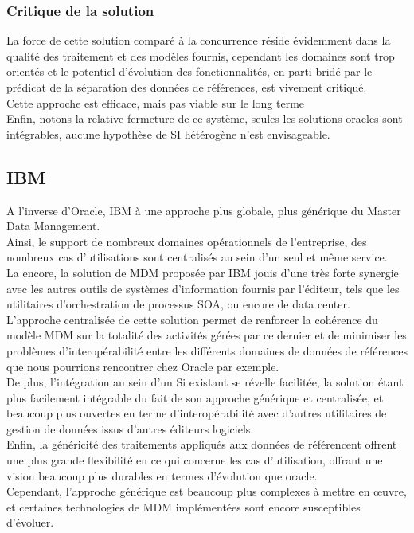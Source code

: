 \subsubsection{Critique de la solution}

La force de cette solution comparé à la concurrence réside évidemment dans la qualité des traitement et des modèles fournis, cependant les domaines sont trop orientés et le potentiel d'évolution des fonctionnalités, en parti bridé par le prédicat de la séparation des données de références, est vivement critiqué.\\
Cette approche est efficace, mais pas viable sur le long terme\\ 
Enfin, notons la relative fermeture de ce système, seules les solutions oracles sont intégrables, aucune hypothèse de SI hétérogène n'est envisageable.

\subsection{IBM}

A l'inverse d'Oracle, IBM à une approche plus globale, plus générique du Master Data Management.\\
Ainsi, le support de nombreux domaines opérationnels de l'entreprise, des nombreux cas d'utilisations sont centralisés au sein d'un seul et même service.\\
La encore, la solution de MDM proposée par IBM jouis d'une très forte synergie avec les autres outils de systèmes d'information fournis par l'éditeur, tels que les utilitaires d'orchestration de processus SOA, ou encore de data center.\\
L'approche centralisée de cette solution permet de renforcer la cohérence du modèle MDM sur la totalité des activités gérées par ce dernier et de minimiser les problèmes d'interopérabilité entre les différents domaines de données de références que nous pourrions rencontrer chez Oracle par exemple.\\
De plus, l'intégration au sein d'un Si existant se révelle facilitée, la solution étant plus facilement intégrable du fait de son approche générique et centralisée, et beaucoup plus ouvertes en terme d'interopérabilité avec d'autres utilitaires de gestion de données issus d'autres éditeurs logiciels.\\
Enfin, la généricité des traitements appliqués aux données de référencent offrent  une plus grande flexibilité en ce qui concerne les cas d'utilisation, offrant une vision beaucoup plus durables en termes d'évolution que oracle.\\
Cependant, l'approche générique est beaucoup plus complexes à mettre en œuvre, et certaines technologies de MDM implémentées sont encore susceptibles d'évoluer.\\

